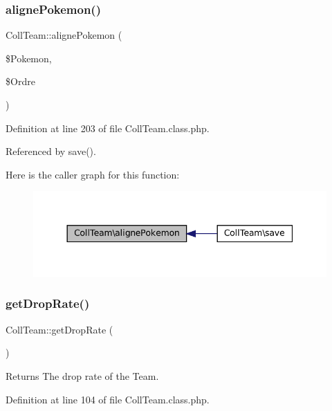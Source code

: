 \subsubsection{\texorpdfstring{aligne\+Pokemon()}{alignePokemon()}}
{\footnotesize\ttfamily Coll\+Team\+::aligne\+Pokemon (\begin{DoxyParamCaption}\item[{}]{\$\+Pokemon,  }\item[{}]{\$\+Ordre }\end{DoxyParamCaption})\hspace{0.3cm}{\ttfamily [protected]}}



Definition at line 203 of file Coll\+Team.\+class.\+php.



Referenced by save().

Here is the caller graph for this function\+:\nopagebreak
\begin{figure}[H]
\begin{center}
\leavevmode
\includegraphics[width=344pt]{class_coll_team_a11c61e291459ab9063885e1a94d12a8c_icgraph}
\end{center}
\end{figure}
\mbox{\label{class_coll_team_af9480eb8f8e9f13225d637228ec58af6}} 
\subsubsection{\texorpdfstring{get\+Drop\+Rate()}{getDropRate()}}
{\footnotesize\ttfamily Coll\+Team\+::get\+Drop\+Rate (\begin{DoxyParamCaption}{ }\end{DoxyParamCaption})}

\begin{DoxyReturn}{Returns}
The drop rate of the Team. 
\end{DoxyReturn}


Definition at line 104 of file Coll\+Team.\+class.\+php.



